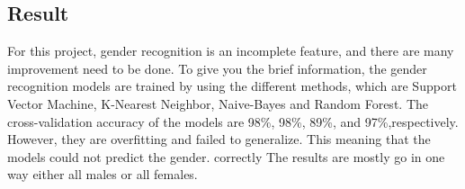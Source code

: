 \documentclass[natbib]{muthesis}
\begin{document}
 \subsection{Result}
 For this project, gender recognition is an incomplete feature, and there are many improvement need to be done. To give you the brief information, the gender recognition models are trained by using the different methods, which are Support Vector Machine, K-Nearest Neighbor, Naive-Bayes and Random Forest. The cross-validation accuracy of the models are 98\%, 98\%, 89\%, and 97\%,respectively. However, they are overfitting and failed to generalize. This meaning that the models could not predict the gender. correctly The results are mostly go in one way either all males or all females.
 
 
  
  \biography
  
\end{document}
